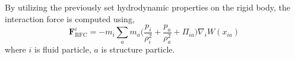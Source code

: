 \documentclass[preprint,12pt]{elsarticle}
\newcommand{\ten}[1]{\ensuremath{\mathbf{#1}}}
\begin{document}
By utilizing the previously set hydrodynamic properties on the rigid body, the
interaction force is computed using,
\begin{equation}
  \ten{F}_{\text{RFC}}^i = -m_i \sum_{a} m_a \bigg(\frac{p_i}{\rho_{i}^2} +
  \frac{p_a}{\rho_{a}^2} + \Pi_{ia} \bigg) \nabla_{i} W(x_{ia})
\end{equation}
where $i$ is fluid particle, $a$ is structure particle.





\end{document}
